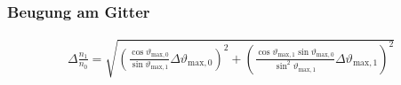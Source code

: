 \subsubsection{Beugung am Gitter}
\begin{align}
	\Delta \frac{n_1}{n_0} = \sqrt{\left(\frac{\cos \vartheta_{\mathrm{max}, 0}}{\sin \vartheta_{\mathrm{max}, 1}} \Delta \vartheta_{\mathrm{max}, 0}\right)^2 + \left(\frac{\cos \vartheta_{\mathrm{max}, 1}\sin \vartheta_{\mathrm{max}, 0} }{\sin^2 \vartheta_{\mathrm{max}, 1}} \Delta \vartheta_{\mathrm{max}, 1} \right)^2} \label{eq:err:beug}
\end{align}
%
%
